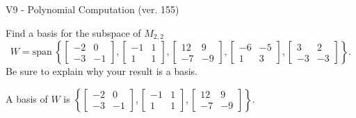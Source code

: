 \begin{exercise}
  \begin{exerciseTitle}V9 - Polynomial Computation (ver. 155)\end{exerciseTitle}
  \begin{exerciseStatement}
    Find a basis for the subspace of \(M_{2,2}\) 
\[W=\mathrm{span}\ \left\{\left[\begin{array}{cc}
-2 & 0 \\
-3 & -1
\end{array}\right] , \left[\begin{array}{cc}
-1 & 1 \\
1 & 1
\end{array}\right] , \left[\begin{array}{cc}
12 & 9 \\
-7 & -9
\end{array}\right] , \left[\begin{array}{cc}
-6 & -5 \\
1 & 3
\end{array}\right] , \left[\begin{array}{cc}
3 & 2 \\
-3 & -3
\end{array}\right]\right\}.\]
 Be sure to explain why your result is a basis.


  \end{exerciseStatement}
  \begin{exerciseAnswer}
   A basis of \(W\) is  \(\left\{\left[\begin{array}{cc}
-2 & 0 \\
-3 & -1
\end{array}\right] , \left[\begin{array}{cc}
-1 & 1 \\
1 & 1
\end{array}\right] , \left[\begin{array}{cc}
12 & 9 \\
-7 & -9
\end{array}\right]\right\}\).
  


  \end{exerciseAnswer}
\end{exercise}